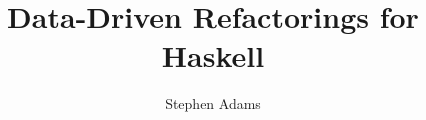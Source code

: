 

\usepackage{hyperref}

\usepackage{makeidx}



\setcounter{secnumdepth}{3} %

\def\fixme#1{\fbox{\textbf{\textsc{Fixme}}\quad#1}}
\def\fixpic#1{\fbox{\textbf{\textsc{Picture}}\quad#1}}
\def\defnx#1#2{\emph{#1}\index{#2}}
\def\defn#1{\defnx{#1}{#1}}
\def\floatpic#1#2{%
\begin{figure}
\texttt{[image: \#2]}
\end{figure}}
\def\inlinepic#1#2{%
\begin{center}
\texttt{[image: \#2]}
\end{center}}




\title{Data-Driven Refactorings for Haskell}
\author{Stephen Adams}
\subject{Computer Science}

